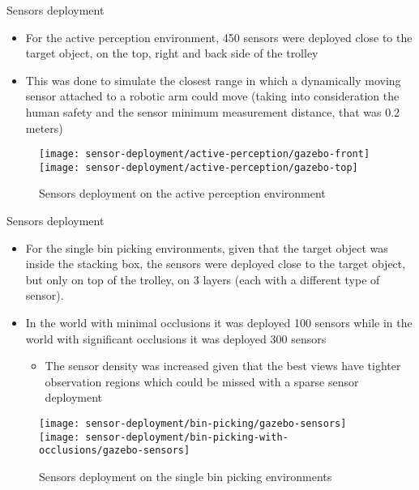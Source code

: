 \begin{frame}{Sensors deployment}
	\begin{itemize}
		\item For the active perception environment, 450 sensors were deployed close to the target object, on the top, right and back side of the trolley
		\item This was done to simulate the closest range in which a dynamically moving sensor attached to a robotic arm could move (taking into consideration the human safety and the sensor minimum measurement distance, that was 0.2 meters)
	\end{itemize}
	\begin{figure}
		\centering
		\texttt{[image: sensor-deployment/active-perception/gazebo-front]}
		\texttt{[image: sensor-deployment/active-perception/gazebo-top]}
		\caption{Sensors deployment on the active perception environment}
	\end{figure}
\end{frame}

\begin{frame}{Sensors deployment}
	\begin{itemize}
		\item For the single bin picking environments, given that the target object was inside the stacking box, the sensors were deployed close to the target object, but only on top of the trolley, on 3 layers (each with a different type of sensor).
		\item In the world with minimal occlusions it was deployed 100 sensors while in the world with significant occlusions it was deployed 300 sensors
			\begin{itemize}
				\item The sensor density was increased given that the best views have tighter observation regions which could be missed with a sparse sensor deployment
			\end{itemize}
	\end{itemize}
	\begin{figure}
		\centering
		\texttt{[image: sensor-deployment/bin-picking/gazebo-sensors]}
		\texttt{[image: sensor-deployment/bin-picking-with-occlusions/gazebo-sensors]}
		\caption{Sensors deployment on the single bin picking environments}
	\end{figure}
\end{frame}

